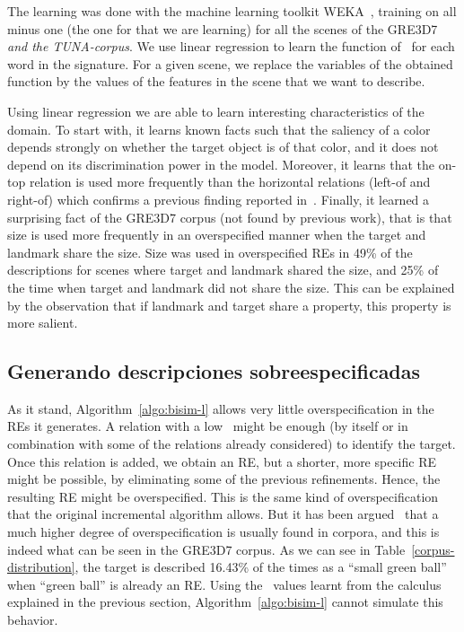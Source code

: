 The learning was done with the machine learning toolkit
WEKA~\cite{Hall:WEK09}, training on all minus one (the one for that we
are learning) for all the scenes of the GRE3D7 \textit{and the
  TUNA-corpus}.  We use linear regression to learn the function of
\puse\ for each word in the signature.  For a given scene, we replace
the variables of the obtained function by the values of the features
in the scene that we want to describe.

Using linear regression we are able to learn interesting
characteristics of the domain. To start with, it learns known facts
such that the saliency of a color depends strongly on whether the
target object is of that color, and it does not depend on its
discrimination power in the model. Moreover, it learns that the on-top
relation is used more frequently than the horizontal relations
(left-of and right-of) which confirms a previous finding reported
in~\cite{viet:gene11}. Finally, it learned a surprising fact of the
GRE3D7 corpus (not found by previous work), that is that size is used
more frequently in an overspecified manner when the target and
landmark share the size. Size was used in overspecified REs in 49\% of
the descriptions for scenes where target and landmark shared the size,
and 25\% of the time when target and landmark did not share the
size. This can be explained by the observation that if landmark and
target share a property, this property is more salient.



\subsection{Generando descripciones sobreespecificadas}\label{sec:overspecification}

As it stand, Algorithm~\ref{algo:bisim-l} allows very little overspecification in the REs it
generates.  A relation with a low \puse\ might be enough 
(by itself or in combination with some of the relations already considered) to 
identify the target. Once this relation is added, we obtain an RE, but a shorter, 
more specific RE might be possible, by eliminating some of the previous refinements. 
Hence, the resulting RE might be overspecified. This is the same kind of overspecification 
that the original incremental algorithm allows.  But it has been argued~\cite{Engelhardt_Bailey_Ferreira_2006,Arts_Maes_Noordman_Jansen_2011} that 
a much higher degree of overspecification is usually found in corpora, and this 
is indeed what can be seen in the GRE3D7 corpus.  As we can see in Table~\ref{corpus-distribution}, 
the target is described 16.43\% of the times as a ``small green ball'' when ``green 
ball'' is already an RE.  Using the \puse\ values learnt from the calculus explained
in the previous section, Algorithm~\ref{algo:bisim-l} cannot simulate this behavior. 

